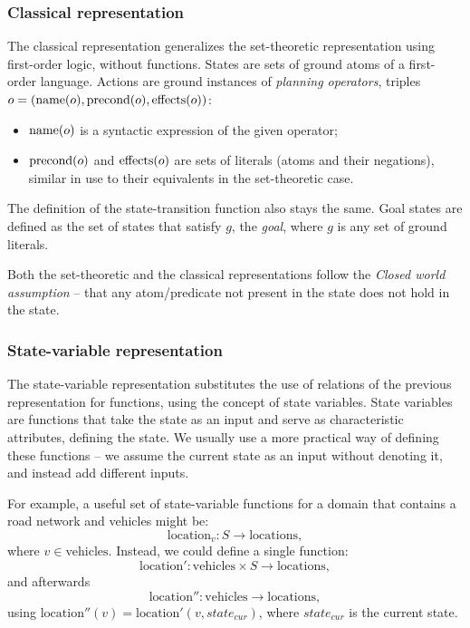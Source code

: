 \subsubsection{Classical representation}

The classical representation generalizes the set-theoretic representation using first-order logic,
without functions.
States are sets of ground atoms of a first-order language.
Actions are ground instances of \textit{planning operators},
triples $o = (\operatorname{\textrm{name}}(o), \operatorname{\textrm{precond}}(o), \operatorname{\textrm{effects}}(o))$:

\begin{itemize}
\item $\operatorname{\textrm{name}}(o)$ is a syntactic expression of the given operator;
\item $\operatorname{\textrm{precond}}(o)$ and $\operatorname{\textrm{effects}}(o)$ are sets of literals
(atoms and their negations), similar in use to their equivalents
in the set-theoretic case.
\end{itemize}

The definition of the state-transition function also stays the same.
Goal states are defined as the set of states that satisfy $g$,
the \textit{goal}, where $g$ is any set of ground literals.

Both the set-theoretic and the classical representations follow the \textit{Closed world assumption} -- that any atom/predicate not present in the state does not hold in the state.

\subsubsection{State-variable representation}

The state-variable representation substitutes the use of relations of the previous
representation for functions,
using the concept of state variables. State variables are functions
that take the state as an input and serve as characteristic attributes, defining the state. We usually use a more practical way of defining these functions -- we assume
the current state as an input without denoting it, and instead add different inputs.

For example, a useful set of state-variable functions for a domain that contains a road
network and vehicles might be: $$\mathrm{location}_{v}: S \to \mathrm{locations},$$
where $v \in \mathrm{vehicles}$.
Instead, we could define a single function:
$$\mathrm{location'}: \mathrm{vehicles} \times S \to \mathrm{locations},$$
and afterwards 
$$\mathrm{location''}: \mathrm{vehicles} \to \mathrm{locations},$$
using $\mathrm{location''}(v) = \mathrm{location'}(v, state_{cur})$, where $state_{cur}$ is the current state.

